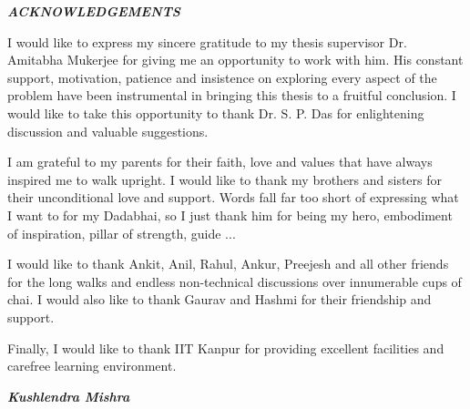 \begin{center}
\begin{large}
{\it{\bf ACKNOWLEDGEMENTS} }
\end{large}
\end{center} 

I would like to express my sincere gratitude to my thesis supervisor
Dr. Amitabha Mukerjee for giving me an opportunity to work with him. His
constant support, motivation, patience and insistence on exploring every
aspect of the problem have been instrumental in bringing this thesis to a
fruitful conclusion. I would like to take this opportunity to thank
Dr. S. P. Das for enlightening discussion and valuable suggestions.

I am grateful to my parents for their faith, love and values that have
always inspired me to walk upright. I would like to thank my brothers and
sisters for their unconditional love and support. Words fall far too short
of expressing what I want to for my Dadabhai, so I just thank him for being
my hero, embodiment of inspiration, pillar of strength, guide ...

I would like to thank Ankit, Anil, Rahul, Ankur, Preejesh and all other
friends for the long walks and endless non-technical discussions over
innumerable cups of chai. I would also like to thank Gaurav and Hashmi for
their friendship and support.

Finally, I would like to thank IIT Kanpur for providing  excellent
facilities and carefree learning environment.

\vskip 4mm
\begin{flushright}
\textit{\textbf{Kushlendra Mishra}}
\end{flushright}
